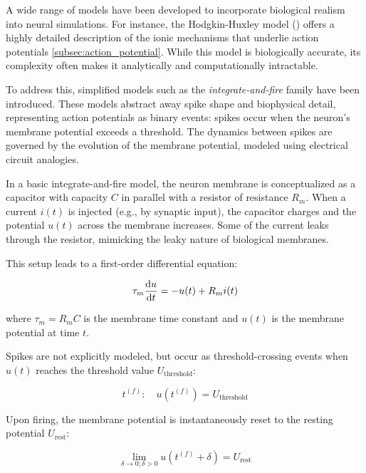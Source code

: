A wide range of models have been developed to incorporate biological realism into neural simulations. For instance, the Hodgkin-Huxley model (\citet{hodgkin1952quantitative}) offers a highly detailed description of the ionic mechanisms that underlie action potentials \ref{subsec:action_potential}. While this model is biologically accurate, its complexity often makes it analytically and computationally intractable.

To address this, simplified models such as the \emph{integrate-and-fire} family have been introduced. These models abstract away spike shape and biophysical detail, representing action potentials as binary events: spikes occur when the neuron's membrane potential exceeds a threshold. The dynamics between spikes are governed by the evolution of the membrane potential, modeled using electrical circuit analogies.

In a basic integrate-and-fire model, the neuron membrane is conceptualized as a capacitor with capacity $C$ in parallel with a resistor of resistance $R_m$. When a current $i(t)$ is injected (e.g., by synaptic input), the capacitor charges and the potential $u(t)$ across the membrane increases. Some of the current leaks through the resistor, mimicking the leaky nature of biological membranes.

This setup leads to a first-order differential equation:


\begin{equation}
    \tau_{m} \odv{u}{t} = -u(t) + R_{m}i(t)
\end{equation}
\label{eq:integrate_and_fire}

where $\tau_m = R_m C$ is the membrane time constant and $u(t)$ is the membrane potential at time $t$.

Spikes are not explicitly modeled, but occur as threshold-crossing events when $u(t)$ reaches the threshold value $U_{\text{threshold}}$:

\begin{equation}
    t^{(f)}: \quad u(t^{(f)}) = U_{\text{threshold}}
\end{equation}
\label{eq:firing_time}

Upon firing, the membrane potential is instantaneously reset to the resting potential $U_{\text{rest}}$:

\begin{equation}
    \lim_{\delta \to 0; \delta > 0} u\left( t^{(f)} + \delta \right) = U_{\text{rest}}
\end{equation}
\label{eq:resting_potential}

